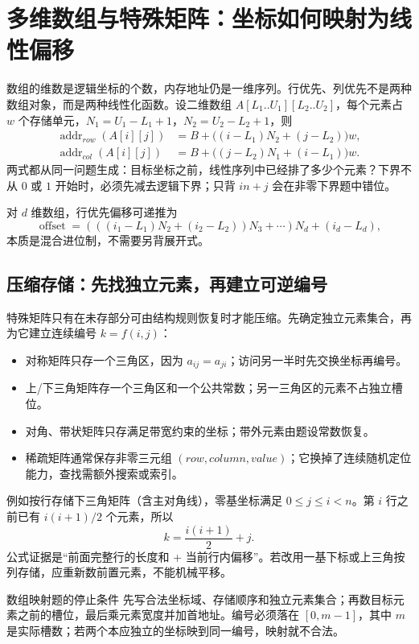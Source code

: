 \documentclass[UTF8,fontset=none,11pt,a4paper]{ctexart}
\begin{document}
\section{多维数组与特殊矩阵：坐标如何映射为线性偏移}
数组的维数是逻辑坐标的个数，内存地址仍是一维序列。行优先、列优先不是两种数组对象，而是两种线性化函数。设二维数组 $A[L_1..U_1][L_2..U_2]$，每个元素占 $w$ 个存储单元，$N_1=U_1-L_1+1$，$N_2=U_2-L_2+1$，则
\[
\begin{aligned}
\operatorname{addr}_{row}(A[i][j])&=B+\bigl((i-L_1)N_2+(j-L_2)\bigr)w,\\
\operatorname{addr}_{col}(A[i][j])&=B+\bigl((j-L_2)N_1+(i-L_1)\bigr)w.
\end{aligned}
\]
两式都从同一问题生成：目标坐标之前，线性序列中已经排了多少个元素？下界不从 $0$ 或 $1$ 开始时，必须先减去逻辑下界；只背 $i n+j$ 会在非零下界题中错位。

对 $d$ 维数组，行优先偏移可递推为
\[
\operatorname{offset}=(((i_1-L_1)N_2+(i_2-L_2))N_3+\cdots)N_d+(i_d-L_d),
\]
本质是混合进位制，不需要另背展开式。

\subsection{压缩存储：先找独立元素，再建立可逆编号}
特殊矩阵只有在未存部分可由结构规则恢复时才能压缩。先确定独立元素集合，再为它建立连续编号 $k=f(i,j)$：
\begin{itemize}
\item 对称矩阵只存一个三角区，因为 $a_{ij}=a_{ji}$；访问另一半时先交换坐标再编号。
\item 上/下三角矩阵存一个三角区和一个公共常数；另一三角区的元素不占独立槽位。
\item 对角、带状矩阵只存满足带宽约束的坐标；带外元素由题设常数恢复。
\item 稀疏矩阵通常保存非零三元组 $(row,column,value)$；它换掉了连续随机定位能力，查找需额外搜索或索引。
\end{itemize}
例如按行存储下三角矩阵（含主对角线），零基坐标满足 $0\le j\le i<n$。第 $i$ 行之前已有 $i(i+1)/2$ 个元素，所以
\[
k=\frac{i(i+1)}2+j.
\]
公式证据是“前面完整行的长度和 + 当前行内偏移”。若改用一基下标或上三角按列存储，应重新数前置元素，不能机械平移。

\begin{methodbox}{数组映射题的停止条件}
先写合法坐标域、存储顺序和独立元素集合；再数目标元素之前的槽位，最后乘元素宽度并加首地址。编号必须落在 $[0,m-1]$，其中 $m$ 是实际槽数；若两个本应独立的坐标映到同一编号，映射就不合法。
\end{methodbox}
\end{document}
